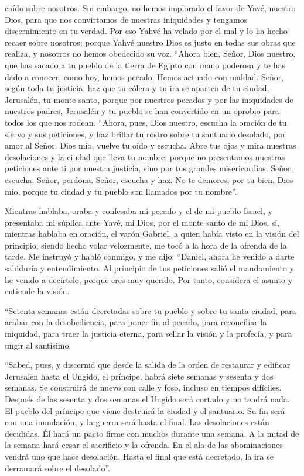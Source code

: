 caído sobre nosotros. Sin embargo, no hemos implorado el favor de Yavé,
nuestro Dios, para que nos convirtamos de nuestras iniquidades y
tengamos discernimiento en tu verdad.  Por eso Yahvé ha
velado por el mal y lo ha hecho recaer sobre nosotros; porque Yahvé
nuestro Dios es justo en todas sus obras que realiza, y nosotros no
hemos obedecido su voz.  ``Ahora bien, Señor, Dios
nuestro, que has sacado a tu pueblo de la tierra de Egipto con mano
poderosa y te has dado a conocer, como hoy, hemos pecado. Hemos actuado
con maldad.  Señor, según toda tu justicia, haz que tu
cólera y tu ira se aparten de tu ciudad, Jerusalén, tu monte santo,
porque por nuestros pecados y por las iniquidades de nuestros padres,
Jerusalén y tu pueblo se han convertido en un oprobio para todos los que
nos rodean.  ``Ahora, pues, Dios nuestro, escucha la
oración de tu siervo y sus peticiones, y haz brillar tu rostro sobre tu
santuario desolado, por amor al Señor.  Dios mío, vuelve
tu oído y escucha. Abre tus ojos y mira nuestras desolaciones y la
ciudad que lleva tu nombre; porque no presentamos nuestras peticiones
ante ti por nuestra justicia, sino por tus grandes misericordias.
 Señor, escucha. Señor, perdona. Señor, escucha y haz. No
te demores, por tu bien, Dios mío, porque tu ciudad y tu pueblo son
llamados por tu nombre''.

 Mientras hablaba, oraba y confesaba mi pecado y el de mi
pueblo Israel, y presentaba mi súplica ante Yavé, mi Dios, por el monte
santo de mi Dios,  sí, mientras hablaba en oración, el
varón Gabriel, a quien había visto en la visión del principio, siendo
hecho volar velozmente, me tocó a la hora de la ofrenda de la tarde.
 Me instruyó y habló conmigo, y me dijo: ``Daniel, ahora
he venido a darte sabiduría y entendimiento.  Al
principio de tus peticiones salió el mandamiento y he venido a
decírtelo, porque eres muy querido. Por tanto, considera el asunto y
entiende la visión.

 ``Setenta semanas están decretadas sobre tu pueblo y
sobre tu santa ciudad, para acabar con la desobediencia, para poner fin
al pecado, para reconciliar la iniquidad, para traer la justicia eterna,
para sellar la visión y la profecía, y para ungir al santísimo.

 ``Sabed, pues, y discernid que desde la salida de la
orden de restaurar y edificar Jerusalén hasta el Ungido, el príncipe,
habrá siete semanas y sesenta y dos semanas. Se construirá de nuevo con
calle y foso, incluso en tiempos difíciles.  Después de
las sesenta y dos semanas el Ungido será cortado y no tendrá nada. El
pueblo del príncipe que viene destruirá la ciudad y el santuario. Su fin
será con una inundación, y la guerra será hasta el final. Las
desolaciones están decididas.  Él hará un pacto firme con
muchos durante una semana. A la mitad de la semana hará cesar el
sacrificio y la ofrenda. En el ala de las abominaciones vendrá uno que
hace desolación. Hasta el final que está decretado, la ira se derramará
sobre el desolado''.

